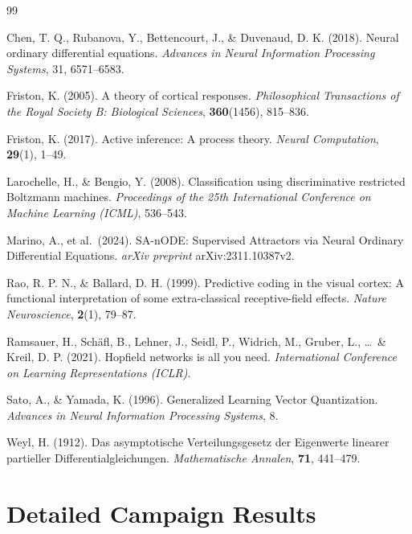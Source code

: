 \documentclass[11pt,a4paper]{article}
\begin{document}
\begin{thebibliography}{99}

Chen, T. Q., Rubanova, Y., Bettencourt, J., \& Duvenaud, D. K. (2018).
Neural ordinary differential equations.
\textit{Advances in Neural Information Processing Systems}, 31, 6571--6583.

Friston, K. (2005).
A theory of cortical responses.
\textit{Philosophical Transactions of the Royal Society B: Biological Sciences},
\textbf{360}(1456), 815--836.

Friston, K. (2017).
Active inference: A process theory.
\textit{Neural Computation}, \textbf{29}(1), 1--49.

Larochelle, H., \& Bengio, Y. (2008).
Classification using discriminative restricted Boltzmann machines.
\textit{Proceedings of the 25th International Conference on Machine Learning (ICML)},
536--543.

Marino, A., et al.\ (2024).
SA-nODE: Supervised Attractors via Neural Ordinary Differential Equations.
\textit{arXiv preprint} arXiv:2311.10387v2.

Rao, R. P. N., \& Ballard, D. H. (1999).
Predictive coding in the visual cortex: A functional interpretation of some
extra-classical receptive-field effects.
\textit{Nature Neuroscience}, \textbf{2}(1), 79--87.

Ramsauer, H., Sch\"{a}fl, B., Lehner, J., Seidl, P., Widrich, M., Gruber, L.,
\ldots\ \& Kreil, D. P. (2021).
Hopfield networks is all you need.
\textit{International Conference on Learning Representations (ICLR)}.

Sato, A., \& Yamada, K. (1996).
Generalized Learning Vector Quantization.
\textit{Advances in Neural Information Processing Systems}, 8.

Weyl, H. (1912).
Das asymptotische Verteilungsgesetz der Eigenwerte linearer partieller
Differentialgleichungen.
\textit{Mathematische Annalen}, \textbf{71}, 441--479.

\end{thebibliography}

\appendix

\section{Detailed Campaign Results}
\end{document}
